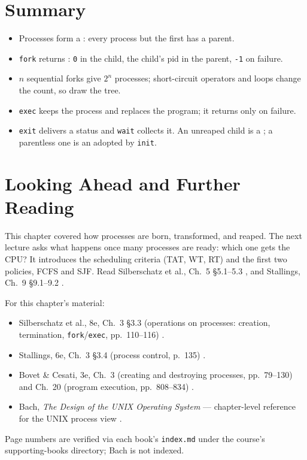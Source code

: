 \documentclass[11pt]{article}
\begin{document}
\section{Summary}

\begin{itemize}
  \item Processes form a : every process but the first has a parent.
  \item \texttt{fork} returns : \texttt{0} in the child, the child's
    pid in the parent, \texttt{-1} on failure.
  \item $n$ sequential forks give $2^n$ processes; short-circuit operators and
    loops change the count, so draw the tree.
  \item \texttt{exec} keeps the process and replaces the program; it returns
    only on failure.
  \item \texttt{exit} delivers a status and \texttt{wait} collects it. An
    unreaped child is a ; a parentless one is an 
    adopted by \texttt{init}.
\end{itemize}

\section{Looking Ahead and Further Reading}

This chapter covered how processes are born, transformed, and reaped. The next
lecture asks what happens once many processes are ready: which one gets the
CPU? It introduces the scheduling criteria (TAT, WT, RT) and the first two
policies, FCFS and SJF. Read Silberschatz et al., Ch.~5 \S5.1--5.3
\cite{SilberschatzOSC_operating_system_concepts}, and Stallings, Ch.~9
\S9.1--9.2 \cite{StallingsOS_internals_design_principles}.

For this chapter's material:
\begin{itemize}
  \item Silberschatz et al., 8e, Ch.~3 \S3.3 (operations on processes:
    creation, termination, \texttt{fork}/\texttt{exec}, pp.~110--116)
    \cite{SilberschatzOSC_operating_system_concepts}.
  \item Stallings, 6e, Ch.~3 \S3.4 (process control, p.~135)
    \cite{StallingsOS_internals_design_principles}.
  \item Bovet \& Cesati, 3e, Ch.~3 (creating and destroying processes,
    pp.~79--130) and Ch.~20 (program execution, pp.~808--834)
    \cite{BovetCesati_understanding_linux_kernel}.
  \item Bach, \emph{The Design of the UNIX Operating System} --- chapter-level
    reference for the UNIX process view
    \cite{Bach1986_design_unix_operating_system}.
\end{itemize}
Page numbers are verified via each book's \texttt{index.md} under the course's
supporting-books directory; Bach is not indexed.
\end{document}

